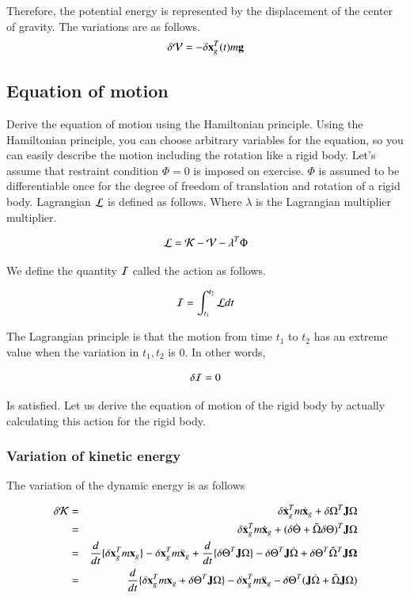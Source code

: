 Therefore, the potential energy is represented by the displacement of the center of gravity.
%
The variations are as follows.
%
\begin{equation}
\delta{\cal V} = -\delta\mathbf{x}_g^T(t)m\mathbf{g}
\end{equation}


\subsection{Equation of motion}
Derive the equation of motion using the Hamiltonian principle. Using the Hamiltonian principle, you can choose arbitrary variables for the equation, so you can easily describe the motion including the rotation like a rigid body.
%
Let's assume that restraint condition $\Phi=0$ is imposed on exercise. $\Phi$ is assumed to be differentiable once for the degree of freedom of translation and rotation of a rigid body.
%
Lagrangian ${\cal L}$ is defined as follows. Where $\lambda$ is the Lagrangian multiplier multiplier.

\begin{equation}
{\cal L} = {\cal K} - {\cal V} -\lambda^T \Phi
\end{equation}

We define the quantity ${\cal I}$ called the action as follows.

\begin{equation}
{\cal I} = \int_{t_1}^{t_2} {\cal L} dt
\end{equation}

The Lagrangian principle is that the motion from time $t_1$ to $t_2$ has an extreme value when the variation in $t_1,t_2$ is 0. In other words,

\begin{equation}
\delta{\cal I}= 0
\end{equation}

Is satisfied. Let us derive the equation of motion of the rigid body by actually calculating this action for the rigid body.


\subsubsection{Variation of kinetic energy}

The variation of the dynamic energy is as follows

\begin{eqnarray}
\delta {\cal K}
&=& \delta\dot{\mathbf{x}}_g^T m \dot{\mathbf{x}}_g + \delta \Omega^T \mathbf{J} \Omega\\
&=& \delta\dot{\mathbf{x}}_g^T m \dot{\mathbf{x}}_g + (\delta \dot{\Theta} + \tilde{\Omega}\delta\Theta)^T \mathbf{J} \Omega\\
&=& \frac{d}{dt}\{\delta \mathbf{x}_g^T m \mathbf{x}_g\} - \delta\mathbf{x}_g^T m\ddot{\mathbf{x}}_g   + \frac{d}{dt}\{\delta\Theta^T \mathbf{J}\Omega\} - \delta\Theta^T\mathbf{J}\dot{\Omega} + \delta\Theta^T\tilde{\Omega}^T\mathbf{J}\mathbf{\Omega}\\
&=& \frac{d}{dt}\{\delta \mathbf{x}_g^T m \mathbf{x}_g + \delta\Theta^T \mathbf{J}\Omega\} - \delta\mathbf{x}_g^T m\ddot{\mathbf{x}}_g  - \delta\Theta^T(\mathbf{J}\dot{\Omega}+\tilde{\Omega}\mathbf{J}\Omega)
\end{eqnarray}

